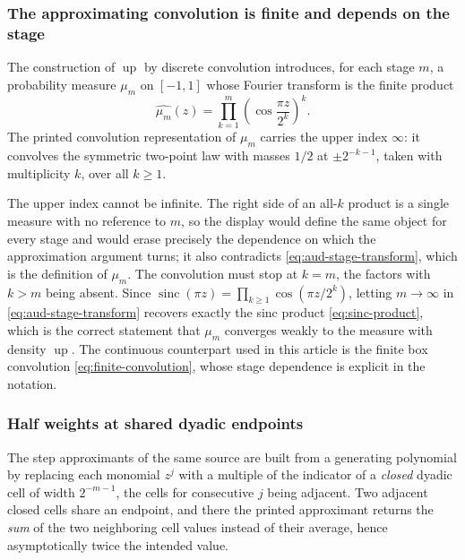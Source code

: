 \documentclass[11pt,oneside]{article}
\theoremstyle{definition}
\theoremstyle{remark}
\newcommand{\Up}{\operatorname{up}}
\newcommand{\sinc}{\operatorname{sinc}}
\begin{document}
\subsubsection{The approximating convolution is finite and depends on the stage}

The construction of $\Up$ by discrete convolution introduces, for each stage $m$, a
probability measure $\mu_m$ on $[-1,1]$ whose Fourier transform is the finite product
\begin{equation}
 \widehat{\mu_m}(z)=\prod_{k=1}^{m}\left(\cos\frac{\pi z}{2^{k}}\right)^{k}.
                                                          \label{eq:aud-stage-transform}
\end{equation}
The printed convolution representation of $\mu_m$ carries the upper index $\infty$: it
convolves the symmetric two-point law with masses $1/2$ at $\pm2^{-k-1}$, taken with
multiplicity $k$, over all $k\ge1$.

The upper index cannot be infinite.  The right side of an all-$k$ product is a single measure
with no reference to $m$, so the display would define the same object for every stage and
would erase precisely the dependence on which the approximation argument turns; it also
contradicts \eqref{eq:aud-stage-transform}, which is the definition of $\mu_m$.  The
convolution must stop at $k=m$, the factors with $k>m$ being absent.  Since
$\sinc(\pi z)=\prod_{k\ge1}\cos(\pi z/2^{k})$, letting $m\to\infty$ in
\eqref{eq:aud-stage-transform} recovers exactly the sinc product \eqref{eq:sinc-product},
which is the correct statement that $\mu_m$ converges weakly to the measure with density
$\Up$.  The continuous counterpart
used in this article is the finite box convolution \eqref{eq:finite-convolution}, whose
stage dependence is explicit in the notation.

\subsubsection{Half weights at shared dyadic endpoints}

The step approximants of the same source are built from a generating polynomial by replacing
each monomial $z^{j}$ with a multiple of the indicator of a \emph{closed} dyadic cell of
width $2^{-m-1}$, the cells for consecutive $j$ being adjacent.  Two adjacent closed cells
share an endpoint, and there the printed approximant returns the \emph{sum} of the two
neighboring cell values instead of their average, hence asymptotically twice the intended
value.
\end{document}
